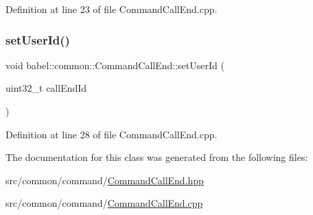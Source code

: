 Definition at line 23 of file Command\+Call\+End.\+cpp.

\mbox{\label{classbabel_1_1common_1_1_command_call_end_a8c80290c0a6ea267b66caad3461fca66}} 
\subsubsection{\texorpdfstring{set\+User\+Id()}{setUserId()}}
{\footnotesize\ttfamily void babel\+::common\+::\+Command\+Call\+End\+::set\+User\+Id (\begin{DoxyParamCaption}\item[{uint32\+\_\+t}]{call\+End\+Id }\end{DoxyParamCaption})}



Definition at line 28 of file Command\+Call\+End.\+cpp.



The documentation for this class was generated from the following files\+:\begin{DoxyCompactItemize}
\item 
src/common/command/\mbox{\hyperlink{_command_call_end_8hpp}{Command\+Call\+End.\+hpp}}\item 
src/common/command/\mbox{\hyperlink{_command_call_end_8cpp}{Command\+Call\+End.\+cpp}}\end{DoxyCompactItemize}
